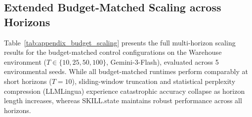 \documentclass[11pt]{article}
\begin{document}
\subsection{Extended Budget-Matched Scaling across Horizons}
\label{appendix:budget_scaling}

Table~\ref{tab:appendix_budget_scaling} presents the full multi-horizon scaling results for the budget-matched control configurations on the Warehouse environment ($T \in \{10, 25, 50, 100\}$, Gemini-3-Flash), evaluated across 5 environmental seeds. While all budget-matched runtimes perform comparably at short horizons ($T=10$), sliding-window truncation and statistical perplexity compression (LLMLingua) experience catastrophic accuracy collapse as horizon length increases, whereas SKILL.state maintains robust performance across all horizons.

\begin{table}[h]
\centering
\caption{Extended Budget-Matched Scaling on Warehouse across Horizons (Gemini-3-Flash, Target Budget $\sim$1,800 tokens, Score $\pm$ SD across 5 seeds).}
\label{tab:appendix_budget_scaling}
\end{table}
\end{document}
